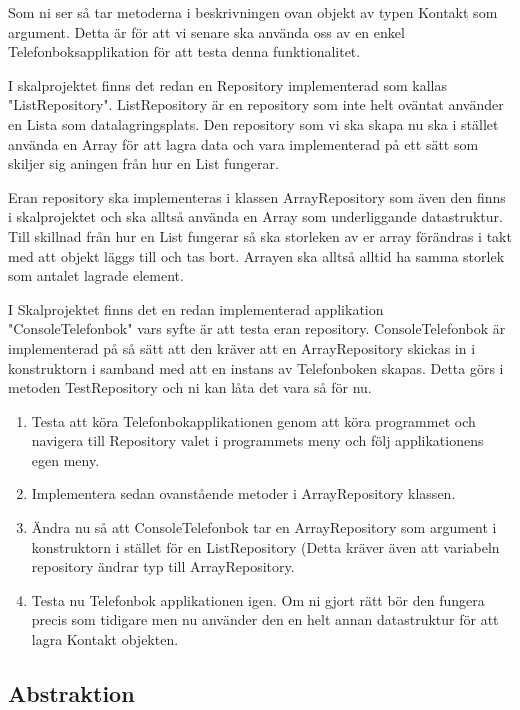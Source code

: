\documentclass{article}
\begin{document}
  Som ni ser så tar metoderna i beskrivningen ovan objekt av typen Kontakt som argument. Detta är för att vi senare ska använda oss av en enkel Telefonboksapplikation för att testa denna funktionalitet.
  
  I skalprojektet finns det redan en Repository implementerad som kallas "ListRepository". ListRepository är en repository som inte helt oväntat använder en Lista som datalagringsplats. Den repository som vi ska skapa nu ska i stället använda en Array för att lagra data och vara implementerad på ett sätt som skiljer sig aningen från hur en List fungerar.
  
  Eran repository ska implementeras i klassen ArrayRepository som även den finns i skalprojektet och ska alltså använda en Array som underliggande datastruktur. Till skillnad från hur en List fungerar så ska storleken av er array förändras i takt med att objekt läggs till och tas bort. Arrayen ska alltså alltid ha samma storlek som antalet lagrade element.

I Skalprojektet finns det en redan implementerad applikation "ConsoleTelefonbok" vars syfte är att testa eran repository. ConsoleTelefonbok är implementerad på så sätt att den kräver att en ArrayRepository skickas in i konstruktorn i samband med att en instans av Telefonboken skapas. Detta görs i metoden TestRepository och ni kan låta det vara så för nu.
    \begin{enumerate}
                 \item Testa att köra Telefonbokapplikationen genom att köra programmet och navigera till Repository valet i programmets meny och följ applikationens egen meny.
    	          \item Implementera sedan ovanstående metoder i ArrayRepository klassen.
    	          \item Ändra nu så att ConsoleTelefonbok tar en ArrayRepository som argument i konstruktorn i stället för en ListRepository (Detta kräver även att variabeln repository ändrar typ till ArrayRepository.
    	          \item Testa nu Telefonbok applikationen igen. Om ni gjort rätt bör den fungera precis som tidigare men nu använder den en helt annan datastruktur för att lagra Kontakt objekten.
    	              
     \end{enumerate}

  \subsection*{Abstraktion}
\end{document}

